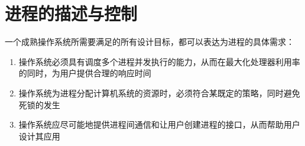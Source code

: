 
\chapter{进程的描述与控制}
{
    一个成熟操作系统所需要满足的所有设计目标，都可以表达为进程的具体需求：

    \begin{enumerate}
        \item 操作系统必须具有调度多个进程并发执行的能力，从而在最大化处理器利用率的同时，为用户提供合理的响应时间
        \item 操作系统为进程分配计算机系统的资源时，必须符合某既定的策略，同时避免死锁的发生
        \item 操作系统应尽可能地提供进程间通信和让用户创建进程的接口，从而帮助用户设计其应用
    \end{enumerate}

    
    
}

\cleardoublepage

\endinput
